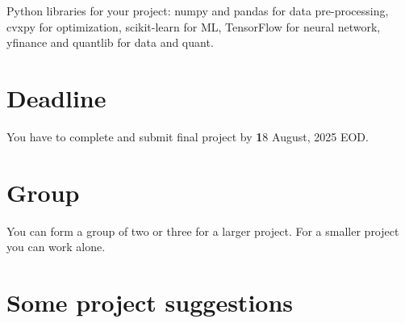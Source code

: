 \documentclass{article}
\begin{document}
Python libraries for your project: numpy and pandas for data pre-processing, cvxpy for optimization, scikit-learn for ML, TensorFlow for neural network, yfinance and quantlib for data and quant. 

\section*{Deadline}
You have to complete and submit final project by {\textbf 18 August, 2025} EOD.

\section*{Group}
You can form a group of two or three for a larger project. For a smaller project you can work alone. 

\newpage

\section*{Some project suggestions}
\end{document}
